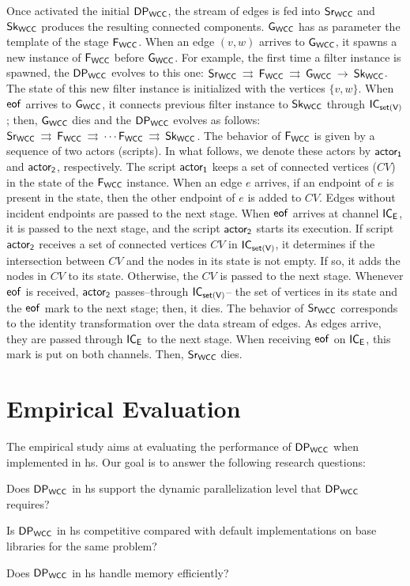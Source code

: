  Once activated the initial $\mathsf{DP_{WCC}}$, the stream of edges is fed into $\mathsf{Sr_{WCC}}$ and $\mathsf{Sk_{WCC}}$ produces the resulting connected components. 
 $\mathsf{G_{WCC}}$ has as parameter the template of the stage  $\mathsf{F_{WCC}}$. When an edge $(v,w)$ arrives to $\mathsf{G_{WCC}}$, it  spawns a new instance of $\mathsf{F_{WCC}}$ before $\mathsf{G_{WCC}}$. 
 For example, the first time a filter instance is spawned, the $\mathsf{DP_{WCC}}$ evolves to this one: $\mathsf{Sr_{WCC}} \:\rightrightarrows\: \mathsf{F_{WCC}} \:\rightrightarrows\: \mathsf{G_{WCC}} \:\rightarrow \: \mathsf{Sk_{WCC}}$. 
 The state of this new filter instance is initialized with the vertices $\{v,w\}$. When $\mathsf{eof}$ arrives to $\mathsf{G_{WCC}}$, it connects previous filter instance to $\mathsf{Sk_{WCC}}$ through $\mathsf{IC_{set(V)}}$; then, $\mathsf{G_{WCC}}$ dies and the $\mathsf{DP_{WCC}}$ evolves as follows: $\mathsf{Sr_{WCC}} \:\rightrightarrows\: \mathsf{F_{WCC}} \:\rightrightarrows\: \cdots \mathsf{F_{WCC}} \:\rightrightarrows \: \mathsf{Sk_{WCC}}$. 
 The behavior of $\mathsf{F_{WCC}}$ is given by a sequence of two actors (scripts). In what follows, we denote these actors by $\mathsf{actor_1}$ and $\mathsf{actor_2}$, respectively. 
 The script $\mathsf{actor_1}$ keeps a set of connected vertices ($CV$) in the state of the $\mathsf{F_{WCC}}$ instance. When an edge $e$ arrives, if an endpoint of $e$ is present in the state, then the other endpoint of $e$ is added to $CV$. 
 Edges without incident endpoints are passed to the next stage. When $\mathsf{eof}$ arrives at channel $\mathsf{IC_E}$, it is passed to the next stage, and the script $\mathsf{actor_2}$ starts its execution. 
 If script $\mathsf{actor_2}$ receives a set of connected vertices $CV$ in $\mathsf{IC_{set(V)}}$, it determines if the intersection between $CV$ and the nodes in its state is not empty. If so, it adds the nodes in $CV$  to its state. 
 Otherwise, the $CV$ is passed to the next stage.  Whenever $\mathsf{eof}$ is received, $\mathsf{actor_2}$ passes--through $\mathsf{IC_{set(V)}}$-- the set of vertices in its state and the $\mathsf{eof}$ mark to the next stage; then, it dies.
 The behavior of $\mathsf{Sr_{WCC}}$ corresponds to the identity transformation over the data stream of edges.  As edges arrive, they are passed through  $\mathsf{IC_E}$ to the next stage. When receiving $\mathsf{eof}$ on $\mathsf{IC_E}$, this mark is put on both channels. 
 Then, $\mathsf{Sr_{WCC}}$ dies. 


\section{Empirical Evaluation}
The empirical study aims at evaluating the performance of $\mathsf{DP_{WCC}}$ when implemented in \acrshort{hs}. 
Our goal is to answer the following research questions: 

\begin{inparaenum}[\bf {\bf RQ}1\upshape)]
\label{res:question}
    \item Does $\mathsf{DP_{WCC}}$ in \acrshort{hs} support the dynamic parallelization level that $\mathsf{DP_{WCC}}$ requires?
    \item Is $\mathsf{DP_{WCC}}$ in \acrshort{hs} competitive compared with default implementations on base libraries for the same problem?
    \item Does $\mathsf{DP_{WCC}}$ in \acrshort{hs} handle memory efficiently?
\end{inparaenum}


